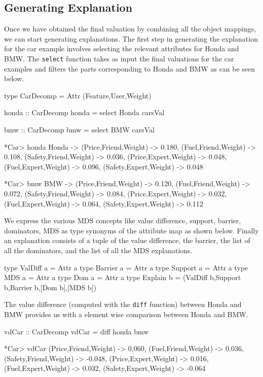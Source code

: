\documentclass{jfp}
\newcommand{\prog}[1]{\texttt{#1}}
\begin{document}
\subsection{Generating Explanation}
Once we have obtained the final valuation by combining all the object mappings, we can start generating explanations. The first step in generating the explanation for the car example involves selecting the relevant attributes for Honda and BMW. The \prog{select} function takes as input the final valuations for the car examples and filters the parts corresponding to Honda and BMW as can be seen below.
\begin{haskellcode}
type CarDecomp = Attr (Feature,User,Weight)

honda :: CarDecomp
honda = select Honda carsVal

bmw :: CarDecomp
bmw = select BMW carsVal

*Car> honda
{Honda -> {(Price,Friend,Weight) -> 0.180,
           (Fuel,Friend,Weight) -> 0.108,
           (Safety,Friend,Weight) -> 0.036,
           (Price,Expert,Weight) -> 0.048,
           (Fuel,Expert,Weight) -> 0.096,
           (Safety,Expert,Weight) -> 0.048}}
 
*Car> bmw
 {BMW -> {(Price,Friend,Weight) -> 0.120,
          (Fuel,Friend,Weight) -> 0.072,
          (Safety,Friend,Weight) -> 0.084,
          (Price,Expert,Weight) -> 0.032,
          (Fuel,Expert,Weight) -> 0.064,
          (Safety,Expert,Weight) -> 0.112}}
\end{haskellcode}
We express the various MDS concepts like value difference, support, barrier, dominators, MDS as type synonyms of the attribute map as shown below. Finally an explanation consists of a tuple of the value difference, the barrier, the list of all the dominators, and the list of all the MDS explanations. 
\begin{haskellcode}
type ValDiff a = Attr a 
type Barrier a = Attr a 
type Support a = Attr a 
type MDS a = Attr a
type Dom a = Attr a 
type Explain b = (ValDiff b,Support b,Barrier b,[Dom b],[MDS b])
\end{haskellcode}
The value difference (computed with the \prog{diff} function) between Honda and BMW provides us with a element wise comparison between Honda and BMW. 
\begin{haskellcode}
vdCar :: CarDecomp
vdCar = diff honda bmw

*Car> vdCar
{(Price,Friend,Weight) -> 0.060,
 (Fuel,Friend,Weight) -> 0.036,
 (Safety,Friend,Weight) -> -0.048,
 (Price,Expert,Weight) -> 0.016,
 (Fuel,Expert,Weight) -> 0.032,
 (Safety,Expert,Weight) -> -0.064}
\end{haskellcode}
\end{document}
